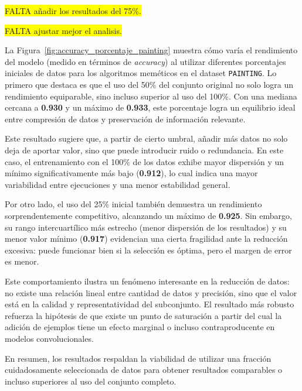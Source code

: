 \colorbox{yellow}{FALTA añadir los resultados del 75\%.}


\colorbox{yellow}{FALTA ajustar mejor el analisis.}

La Figura~\ref{fig:accuracy_porcentaje_painting} muestra cómo varía el rendimiento del modelo (medido en términos de \textit{accuracy})
al utilizar diferentes porcentajes iniciales de datos para los algoritmos meméticos en el dataset \texttt{PAINTING}.
Lo primero que destaca es que el uso del 50\% del conjunto original no solo logra un rendimiento equiparable, sino incluso superior al uso del 100\%.
Con una mediana cercana a \textbf{0.930} y un máximo de \textbf{0.933}, este porcentaje logra un equilibrio ideal entre compresión de datos y preservación de información relevante.

Este resultado sugiere que, a partir de cierto umbral, añadir más datos no solo deja de aportar valor, sino que puede introducir ruido o redundancia.
En este caso, el entrenamiento con el 100\% de los datos exhibe mayor dispersión y un mínimo significativamente más bajo (\textbf{0.912}),
lo cual indica una mayor variabilidad entre ejecuciones y una menor estabilidad general.

Por otro lado, el uso del 25\% inicial también demuestra un rendimiento sorprendentemente competitivo,
alcanzando un máximo de \textbf{0.925}.
Sin embargo, su rango intercuartílico más estrecho (menor dispersión de los resultados) y su menor valor mínimo
(\textbf{0.917}) evidencian una cierta fragilidad ante la reducción excesiva:
puede funcionar bien si la selección es óptima, pero el margen de error es menor.

Este comportamiento ilustra un fenómeno interesante en la reducción de datos: no existe una relación lineal entre cantidad de datos y precisión,
sino que el valor está en la calidad y representatividad del subconjunto.
El resultado más robusto refuerza la hipótesis de que existe un punto de saturación
a partir del cual la adición de ejemplos tiene un efecto marginal o incluso contraproducente en modelos convolucionales.

En resumen, los resultados respaldan la viabilidad de utilizar una fracción cuidadosamente seleccionada de datos para obtener
resultados comparables o incluso superiores al uso del conjunto completo.

